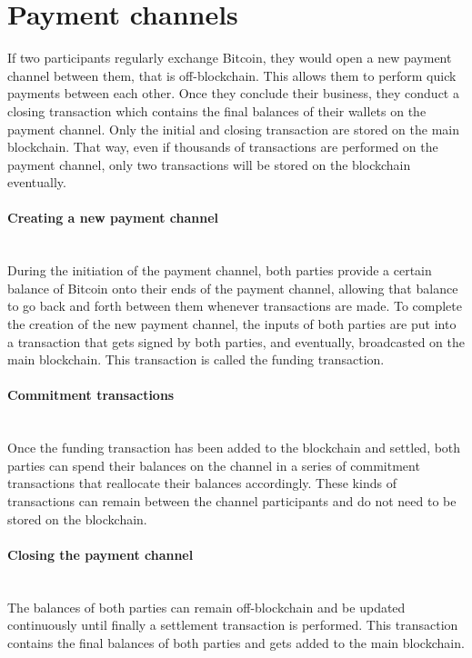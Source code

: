\documentclass[a4paper, 12pt]{report}
\begin{document}
\section{Payment channels}

\par If two participants regularly exchange Bitcoin, they would open a new payment channel between them, that is off-blockchain. This allows them to perform quick payments between each other. Once they conclude their business, they conduct a closing transaction which contains the final balances of their wallets on the payment channel. Only the initial and closing transaction are stored on the main blockchain. That way, even if thousands of transactions are performed on the payment channel, only two transactions will be stored on the blockchain eventually.

\paragraph{Creating a new payment channel} \hspace{0pt} \\
During the initiation of the payment channel, both parties provide a certain balance of Bitcoin onto their ends of the payment channel, allowing that balance to go back and forth between them whenever transactions are made. To complete the creation of the new payment channel, the inputs of both parties are put into a transaction that gets signed by both parties, and eventually, broadcasted on the main blockchain. This transaction is called the funding transaction.

\paragraph{Commitment transactions} \hspace{0pt} \\
Once the funding transaction has been added to the blockchain and settled, both parties can spend their balances on the channel in a series of commitment transactions that reallocate their balances accordingly. These kinds of transactions can remain between the channel participants and do not need to be stored on the blockchain.

\paragraph{Closing the payment channel} \hspace{0pt} \\
The balances of both parties can remain off-blockchain and be updated continuously until finally a settlement transaction is performed. This transaction contains the final balances of both parties and gets added to the main blockchain.
\end{document}

